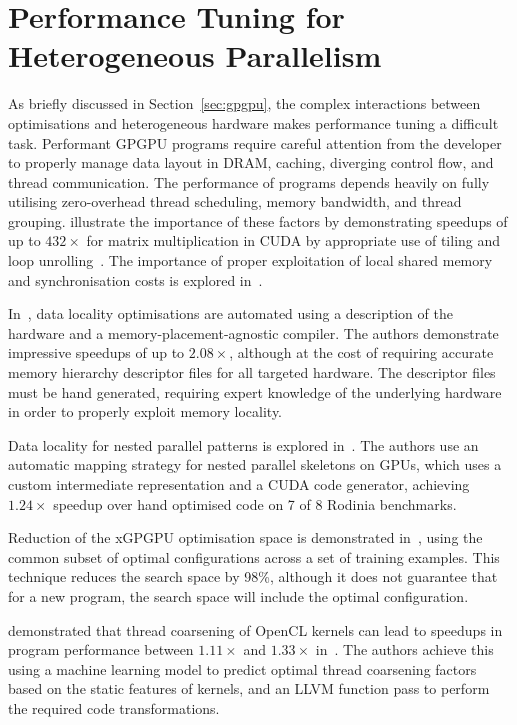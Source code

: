\section{Performance Tuning for Heterogeneous Parallelism}

As briefly discussed in Section~\ref{sec:gpgpu}, the complex
interactions between optimisations and heterogeneous hardware makes
performance tuning a difficult task. Performant GPGPU programs require
careful attention from the developer to properly manage data layout in
DRAM, caching, diverging control flow, and thread communication. The
performance of programs depends heavily on fully utilising
zero-overhead thread scheduling, memory bandwidth, and thread
grouping. \citeauthor{Ryoo2008a} illustrate the importance of these
factors by demonstrating speedups of up to $432\times$ for matrix
multiplication in CUDA by appropriate use of tiling and loop
unrolling~\cite{Ryoo2008a}. The importance of proper exploitation of
local shared memory and synchronisation costs is explored
in~\cite{Lee2010}.

In~\cite{Chen2014}, data locality optimisations are automated using a
description of the hardware and a memory-placement-agnostic
compiler. The authors demonstrate impressive speedups of up to
$2.08\times$, although at the cost of requiring accurate memory
hierarchy descriptor files for all targeted hardware. The descriptor
files must be hand generated, requiring expert knowledge of the
underlying hardware in order to properly exploit memory locality.

Data locality for nested parallel patterns is explored in~\cite{Lee}.
The authors use an automatic mapping strategy for nested parallel
skeletons on GPUs, which uses a custom intermediate representation and
a CUDA code generator, achieving $1.24\times$ speedup over hand
optimised code on 7 of 8 Rodinia benchmarks.

Reduction of the xGPGPU optimisation space is demonstrated
in~\cite{Ryoo2008}, using the common subset of optimal configurations
across a set of training examples. This technique reduces the search
space by 98\%, although it does not guarantee that for a new program,
the search space will include the optimal configuration.

\citeauthor{Magni2014} demonstrated that thread coarsening of OpenCL
kernels can lead to speedups in program performance between
$1.11\times$ and $1.33\times$ in~\cite{Magni2014}. The authors achieve
this using a machine learning model to predict optimal thread
coarsening factors based on the static features of kernels, and an
LLVM function pass to perform the required code transformations.

